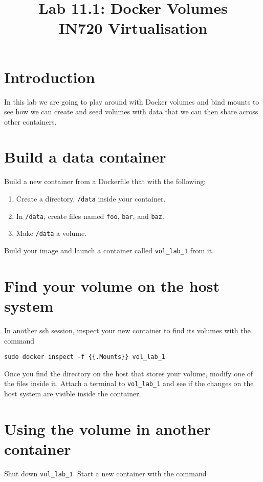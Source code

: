 \documentclass{article}
\begin{document}
\title{Lab 11.1: Docker Volumes\\ IN720 Virtualisation}
\date{}
\maketitle

\section*{Introduction}
In this lab we are going to play around with Docker volumes and bind mounts to see how we can create and seed volumes with data that we can then share across other containers.


\section{Build a data container}
Build a new container from a Dockerfile that with the following:

\begin{enumerate}
	\item Create a directory, \texttt{/data} inside your container.
	\item In \texttt{/data}, create files named \texttt{foo}, \texttt{bar}, and \texttt{baz}.
	\item Make \texttt{/data} a volume.
\end{enumerate}

Build your image and launch a container called \texttt{vol\_lab\_1} from it.


\section{Find your volume on the host system}
In another ssh session, inspect your new container to find its volumes with the command

\texttt{sudo docker inspect -f \{\{.Mounts\}\} vol\_lab\_1}

Once you find the directory on the host that stores your volume, modify one of the files inside it.  Attach a terminal to \texttt{vol\_lab\_1} and see if the changes on the host system are visible inside the container.

\section{Using the volume in another container}
Shut down \texttt{vol\_lab\_1}.  Start a new container with the command
\end{document}
